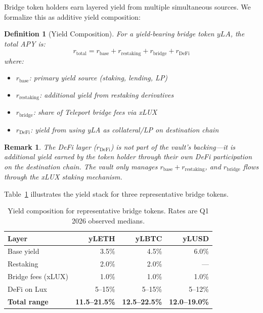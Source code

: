 \documentclass[11pt,twocolumn]{article}
\newtheorem{definition}{Definition}[section]
\newtheorem{remark}{Remark}[section]
\begin{document}
Bridge token holders earn layered yield from multiple simultaneous sources. We formalize this as additive yield composition:

\begin{definition}[Yield Composition]
For a yield-bearing bridge token $yLA$, the total APY is:
\begin{equation}\label{eq:yield_composition}
  r_{\text{total}} = r_{\text{base}} + r_{\text{restaking}} + r_{\text{bridge}} + r_{\text{DeFi}}
\end{equation}
where:
\begin{itemize}[nosep]
  \item $r_{\text{base}}$: primary yield source (staking, lending, LP)
  \item $r_{\text{restaking}}$: additional yield from restaking derivatives
  \item $r_{\text{bridge}}$: share of Teleport bridge fees via xLUX
  \item $r_{\text{DeFi}}$: yield from using yLA as collateral/LP on destination chain
\end{itemize}
\end{definition}

\begin{remark}
The DeFi layer ($r_{\text{DeFi}}$) is not part of the vault's backing---it is additional yield earned by the token holder through their own DeFi participation on the destination chain. The vault only manages $r_{\text{base}} + r_{\text{restaking}}$, and $r_{\text{bridge}}$ flows through the xLUX staking mechanism.
\end{remark}

Table~\ref{tab:yield_composition} illustrates the yield stack for three representative bridge tokens.

\begin{table}[ht]
\centering
\small
\caption{Yield composition for representative bridge tokens. Rates are Q1 2026 observed medians.}
\label{tab:yield_composition}
\begin{tabular}{@{}lrrr@{}}
\toprule
\textbf{Layer} & \textbf{yLETH} & \textbf{yLBTC} & \textbf{yLUSD} \\
\midrule
Base yield & 3.5\% & 4.5\% & 6.0\% \\
Restaking & 2.0\% & 2.0\% & --- \\
Bridge fees (xLUX) & 1.0\% & 1.0\% & 1.0\% \\
DeFi on Lux & 5--15\% & 5--15\% & 5--12\% \\
\midrule
\textbf{Total range} & \textbf{11.5--21.5\%} & \textbf{12.5--22.5\%} & \textbf{12.0--19.0\%} \\
\bottomrule
\end{tabular}
\end{table}
\end{document}
